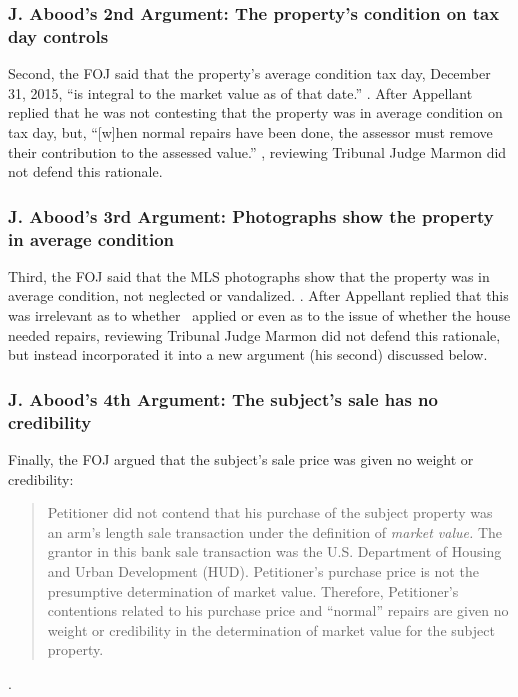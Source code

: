 \documentclass[12pt,\documentclassflag]{michiganCourtOfAppealsBrief}
\begin{document}
\subsubsection{J. Abood's 2nd Argument: The property's condition on tax day controls}

Second, the FOJ said that the property's average condition tax day, December 31, 2015, ``is integral to the market value as of that date.'' . After Appellant replied that he was not contesting that the property was in average condition on tax day, but, ``[w]hen normal repairs have been done, the assessor must remove their contribution to the assessed value.'' , reviewing Tribunal Judge Marmon did not defend this rationale.

\subsubsection{J. Abood's 3rd Argument: Photographs show the property in average condition}

Third, the FOJ said that the MLS photographs show that the property was in average condition, not neglected or vandalized. . After Appellant replied that this was irrelevant as to whether \mathieuGast\ applied or even as to the issue of whether the house needed repairs, reviewing Tribunal Judge Marmon did not defend this rationale, but instead incorporated it into a new argument (his second) discussed below.

\subsubsection{J. Abood's 4th Argument: The subject's sale has no credibility}

Finally, the FOJ argued that the subject's sale price was given no weight or credibility:

\begin{quote}
  Petitioner did not contend that his purchase of the subject property was an arm's length sale transaction under the definition of \emph{market value.} The grantor in this bank sale transaction was the U.S. Department of Housing and Urban Development (HUD). Petitioner's purchase price is not the presumptive determination of market value. Therefore, Petitioner's contentions related to his purchase price and ``normal'' repairs are given no weight or credibility in the determination of market value for the subject property.
\end{quote}
.
\end{document}
